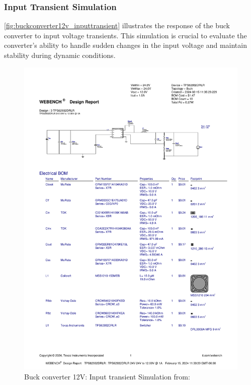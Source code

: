 \subsubsection{Input Transient Simulation}
\autoref{fig:buckconverter12v_inputtransient} illustrates the response of the buck converter to input voltage transients. This simulation is crucial to evaluate the converter's ability to handle sudden changes in the input voltage and maintain stability during dynamic conditions.
\begin{figure}[H]
    \centering
    \includegraphics[trim=0 205 0 70,clip,width=0.8\linewidth,page=8]{img//buckconverters//12v/WBDesign3_Input Transient.pdf}
    \caption{Buck converter 12V: Input transient Simulation from: %
    }
    \label{fig:buckconverter12v_inputtransient}
\end{figure}

